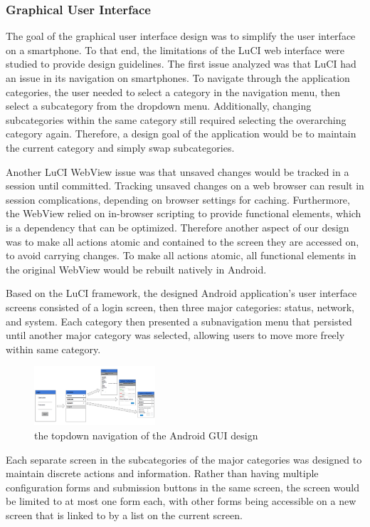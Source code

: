 \subsubsection{Graphical User Interface}
The goal of the graphical user interface design was to simplify the user interface on a smartphone. To that end, the limitations of the LuCI web interface were studied to provide design guidelines. The first issue analyzed was that LuCI had an issue in its navigation on smartphones. To navigate through the application categories, the user needed to select a category in the navigation menu, then select a subcategory from the dropdown menu. Additionally, changing subcategories within the same category still required selecting the overarching category again. Therefore, a design goal of the application would be to maintain the current category and simply swap subcategories.
	
Another LuCI WebView issue was that unsaved changes would be tracked in a session until committed. Tracking unsaved changes on a web browser can result in session complications, depending on browser settings for caching. Furthermore, the WebView relied on in-browser scripting to provide functional elements, which is a dependency that can be optimized. Therefore another aspect of our design was to make all actions atomic and contained to the screen they are accessed on, to avoid carrying changes. To make all actions atomic, all functional elements in the original WebView would be rebuilt natively in Android.
	
Based on the LuCI framework, the designed Android application's user interface screens consisted of a login screen, then three major categories: status, network, and system. Each category then presented a subnavigation menu that persisted until another major category was selected, allowing users to move more freely within same category.

	\begin{figure}
		\centering
		\includegraphics[width=0.4\textwidth]{UItopdown.png}
		\caption{the topdown navigation of the Android GUI design}
		\label{OpenWRT:androidtopdown}
	\end{figure}
	
Each separate screen in the subcategories of the major categories was designed to maintain discrete actions and information. Rather than having multiple configuration forms and submission buttons in the same screen, the screen would be limited to at most one form each, with other forms being accessible on a new screen that is linked to by a list on the current screen.

